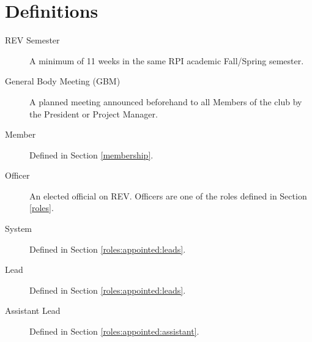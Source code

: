 \section{Definitions}
\label{definitions}
\begin{description}
\item[REV Semester] A minimum of 11 weeks in the same RPI academic Fall/Spring semester.
\item[General Body Meeting (GBM)] A planned meeting announced beforehand to all Members of the club by the President or Project Manager.
\item[Member] Defined in Section \ref{membership}.
\item[Officer] An elected official on REV. Officers are one of the roles defined in Section \ref{roles}.
\item[System] Defined in Section \ref{roles:appointed:leads}.
\item[Lead] Defined in Section \ref{roles:appointed:leads}.
\item[Assistant Lead] Defined in Section \ref{roles:appointed:assistant}.
\end{description}